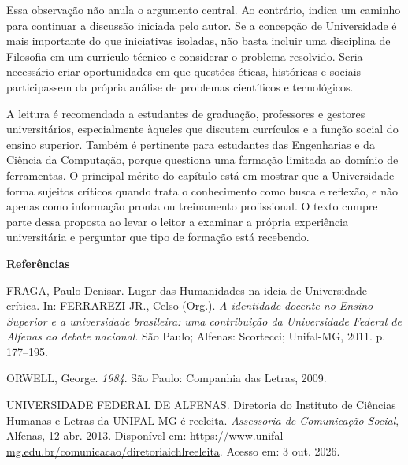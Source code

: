 \documentclass[12pt,a4paper]{article}
\begin{document}
Essa observação não anula o argumento central. Ao contrário, indica um caminho para continuar a discussão iniciada pelo autor. Se a concepção de Universidade é mais importante do que iniciativas isoladas, não basta incluir uma disciplina de Filosofia em um currículo técnico e considerar o problema resolvido. Seria necessário criar oportunidades em que questões éticas, históricas e sociais participassem da própria análise de problemas científicos e tecnológicos.

A leitura é recomendada a estudantes de graduação, professores e gestores universitários, especialmente àqueles que discutem currículos e a função social do ensino superior. Também é pertinente para estudantes das Engenharias e da Ciência da Computação, porque questiona uma formação limitada ao domínio de ferramentas. O principal mérito do capítulo está em mostrar que a Universidade forma sujeitos críticos quando trata o conhecimento como busca e reflexão, e não apenas como informação pronta ou treinamento profissional. O texto cumpre parte dessa proposta ao levar o leitor a examinar a própria experiência universitária e perguntar que tipo de formação está recebendo.

\begin{center}
\textbf{\large Referências}
\end{center}
\vspace{6pt}

\begin{singlespace}
\sloppy
\noindent\setlength{\parindent}{0pt}%
FRAGA, Paulo Denisar. Lugar das Humanidades na ideia de Universidade crítica. In: FERRAREZI JR., Celso (Org.). \textit{A identidade docente no Ensino Superior e a universidade brasileira: uma contribuição da Universidade Federal de Alfenas ao debate nacional}. São Paulo; Alfenas: Scortecci; Unifal-MG, 2011. p. 177--195.

\par\vspace{6pt}\noindent
ORWELL, George. \textit{1984}. São Paulo: Companhia das Letras, 2009.

\par\vspace{6pt}\noindent
UNIVERSIDADE FEDERAL DE ALFENAS. Diretoria do Instituto de Ciências Humanas e Letras da UNIFAL-MG é reeleita. \textit{Assessoria de Comunicação Social}, Alfenas, 12 abr. 2013. Disponível em: \url{https://www.unifal-mg.edu.br/comunicacao/diretoriaichlreeleita}. Acesso em: 3 out. 2026.
\end{singlespace}
\end{document}
